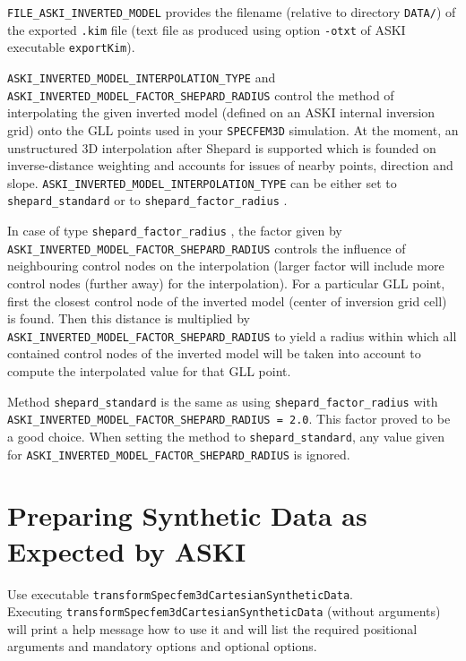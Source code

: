 \documentclass[12pt,a4paper]{article}
\newcommand{\lcode}[1]{\nolinkurl{#1}}
\newcommand{\ASKI}{ {\ttfamily ASKI} }
\begin{document}
\lcode{FILE_ASKI_INVERTED_MODEL} provides the filename (relative to directory \lcode{DATA/}) of the exported 
\lcode{.kim} file (text file as produced using option \lcode{-otxt} of \ASKI executable \lcode{exportKim}).

\lcode{ASKI_INVERTED_MODEL_INTERPOLATION_TYPE} and \lcode{ASKI_INVERTED_MODEL_FACTOR_SHEPARD_RADIUS}
control the method of interpolating the given inverted model (defined on an \ASKI internal inversion grid) 
onto the GLL points used in your \lcode{SPECFEM3D} simulation. At the moment, an unstructured 3D 
interpolation after Shepard \cite{Shepard68} is supported  which is founded on inverse-distance weighting 
and accounts for issues of nearby points, direction and slope. 
\lcode{ASKI_INVERTED_MODEL_INTERPOLATION_TYPE}
can be either set to \lcode{shepard_standard} or to \lcode{shepard_factor_radius} .

In case of type \lcode{shepard_factor_radius} , the factor given by \lcode{ASKI_INVERTED_MODEL_FACTOR_SHEPARD_RADIUS}
controls the influence of neighbouring control nodes on the interpolation (larger factor will include more 
control nodes (further away) for the interpolation). For a particular GLL point, first the closest control node of the inverted model
(center of inversion grid cell) is found. Then this distance is multiplied by 
\lcode{ASKI_INVERTED_MODEL_FACTOR_SHEPARD_RADIUS} to yield a radius within which all contained control nodes
of the inverted model will be taken into account to compute the interpolated value for that GLL point.

Method \lcode{shepard_standard} is the same as using \lcode{shepard_factor_radius} with \lcode{ASKI_INVERTED_MODEL_FACTOR_SHEPARD_RADIUS = 2.0}.
This factor proved to be a good choice. When setting the method to \lcode{shepard_standard}, any value given for 
\lcode{ASKI_INVERTED_MODEL_FACTOR_SHEPARD_RADIUS} is ignored.
%
\section{Preparing Synthetic Data as Expected by \ASKI}
%
Use executable \lcode{transformSpecfem3dCartesianSyntheticData}.\\
Executing 
\lcode{transformSpecfem3dCartesianSyntheticData} (without arguments) will print a
help message how to use it and will list the required positional arguments and mandatory
options and optional options.
\end{document}
